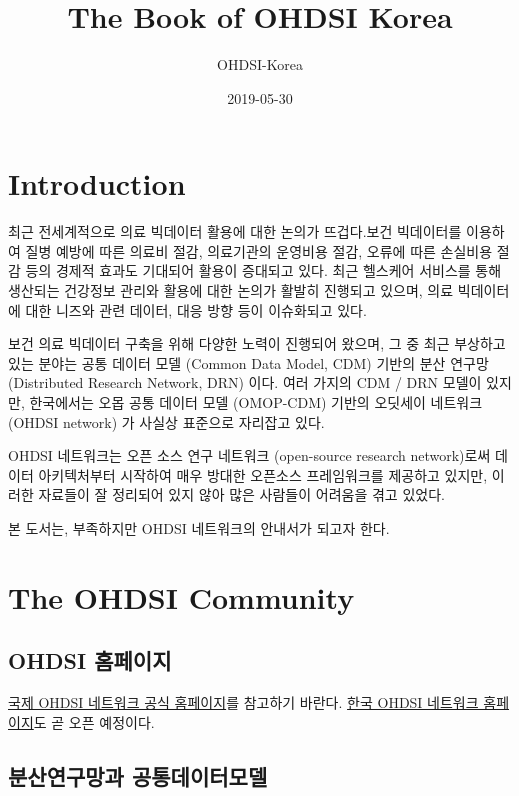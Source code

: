 \documentclass[]{book}
\title{The Book of OHDSI Korea}
\author{OHDSI-Korea}
\date{2019-05-30}
\begin{document}
\maketitle

{
\setcounter{tocdepth}{1}
\tableofcontents
}
\hypertarget{introduction}{%
\chapter{Introduction}\label{introduction}}

최근 전세계적으로 의료 빅데이터 활용에 대한 논의가 뜨겁다.보건 빅데이터를 이용하여 질병 예방에 따른 의료비 절감, 의료기관의 운영비용 절감, 오류에 따른 손실비용 절감 등의 경제적 효과도 기대되어 활용이 증대되고 있다. 최근 헬스케어 서비스를 통해 생산되는 건강정보 관리와 활용에 대한 논의가 활발히 진행되고 있으며, 의료 빅데이터에 대한 니즈와 관련 데이터, 대응 방향 등이 이슈화되고 있다.

보건 의료 빅데이터 구축을 위해 다양한 노력이 진행되어 왔으며, 그 중 최근 부상하고 있는 분야는 공통 데이터 모델 (Common Data Model, CDM) 기반의 분산 연구망 (Distributed Research Network, DRN) 이다. 여러 가지의 CDM / DRN 모델이 있지만, 한국에서는 오몹 공통 데이터 모델 (OMOP-CDM) 기반의 오딧세이 네트워크 (OHDSI network) 가 사실상 표준으로 자리잡고 있다.

OHDSI 네트워크는 오픈 소스 연구 네트워크 (open-source research network)로써 데이터 아키텍처부터 시작하여 매우 방대한 오픈소스 프레임워크를 제공하고 있지만, 이러한 자료들이 잘 정리되어 있지 않아 많은 사람들이 어려움을 겪고 있었다.

본 도서는, 부족하지만 OHDSI 네트워크의 안내서가 되고자 한다.

\hypertarget{ohdsiCommunity}{%
\chapter{The OHDSI Community}\label{ohdsiCommunity}}

\hypertarget{ohdsi-}{%
\section{OHDSI 홈페이지}\label{ohdsi-}}

\href{https://www.ohdsi.org/}{국제 OHDSI 네트워크 공식 홈페이지}를 참고하기 바란다. \href{https://www.ohdsi-korea.org/}{한국 OHDSI 네트워크 홈페이지}도 곧 오픈 예정이다.

\hypertarget{drnCdm}{%
\section{분산연구망과 공통데이터모델}\label{drnCdm}}
\end{document}
